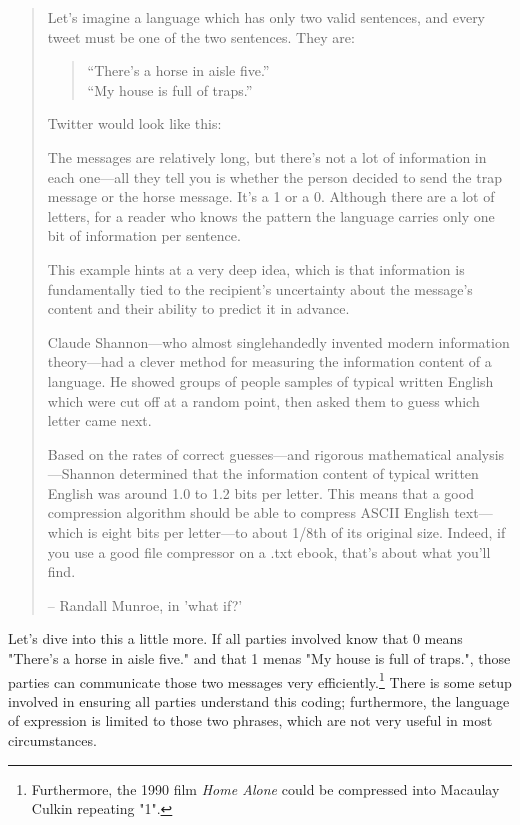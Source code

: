 \begin{quotation}\em{
Let’s imagine a language which has only two valid sentences, and every tweet must be one of the two sentences. They are:

\begin{quotation}
“There’s a horse in aisle five.”\\
“My house is full of traps.”
\end{quotation}

Twitter would look like this:

The messages are relatively long, but there’s not a lot of information in each one—all they tell you is whether the person decided to send the trap message or the horse message. It’s a 1 or a 0. Although there are a lot of letters, for a reader who knows the pattern the language carries only one bit of information per sentence.

This example hints at a very deep idea, which is that information is fundamentally tied to the recipient’s uncertainty about the message’s content and their ability to predict it in advance.

Claude Shannon—who almost singlehandedly invented modern information theory—had a clever method for measuring the information content of a language. He showed groups of people samples of typical written English which were cut off at a random point, then asked them to guess which letter came next.

Based on the rates of correct guesses—and rigorous mathematical analysis—Shannon determined that the information content of typical written English was around 1.0 to 1.2 bits per letter. This means that a good compression algorithm should be able to compress ASCII English text—which is eight bits per letter—to about 1/8th of its original size. Indeed, if you use a good file compressor on a .txt ebook, that’s about what you’ll find.
}
-- Randall Munroe, in 'what if?'\cite{xkcd-what-if-34}
\end{quotation}

Let's dive into this a little more. If all parties involved know that 0 means "There's a horse in aisle five." and that 1 menas "My house is full of traps.", those parties can communicate those two messages very efficiently.\footnote{Furthermore, the 1990 film \textit{Home Alone} could be compressed into Macaulay Culkin repeating "1".} There is some setup involved in ensuring all parties understand this coding; furthermore, the language of expression is limited to those two phrases, which are not very useful in most circumstances.

